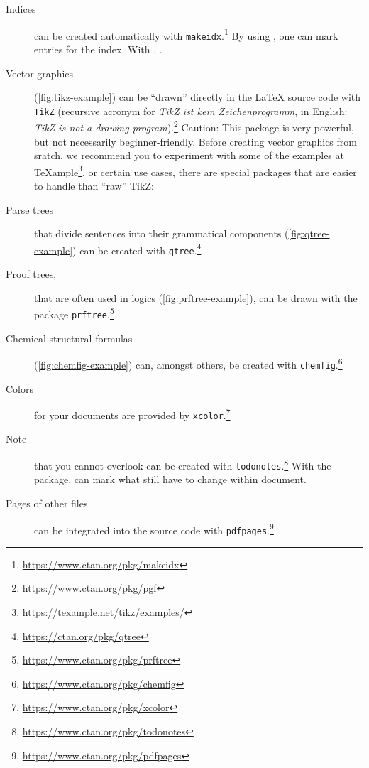 \begin{description}
	\item[Indices]
		can be created automatically with \texttt{makeidx}.\footnote{\url{https://www.ctan.org/pkg/makeidx}}
		By using \texttt{}, one can mark entries for the index. With \texttt{\printindex}, .
	\item[Vector graphics]
		(\cref{fig:tikz-example})
				can be \enquote{drawn} directly in the \LaTeX{} source code with \texttt{TikZ} (recursive acronym for \emph{TikZ ist kein Zeichenprogramm}, in English: \emph{TikZ is not a drawing program}).\footnote{\url{https://www.ctan.org/pkg/pgf}}
		Caution: This package is very powerful, but not necessarily beginner-friendly.
		Before creating vector graphics from sratch, we recommend you to experiment with some of the examples at \TeX{}ample\footnote{\url{https://texample.net/tikz/examples/}}. 
		or certain use cases, there are special packages that are easier to handle than \enquote{raw} TikZ:
	\item[Parse trees]
		that divide sentences into their grammatical components (\cref{fig:qtree-example}) can be created with \texttt{qtree}.\footnote{\url{https://ctan.org/pkg/qtree}}
	\item[Proof trees,]
		that are often used in logics (\cref{fig:prftree-example}), can be drawn with the package \texttt{prftree}.\footnote{\url{https://www.ctan.org/pkg/prftree}}
	\item[Chemical structural formulas]
		(\cref{fig:chemfig-example})
		can, amongst others, be created with  \texttt{chemfig}.\footnote{\url{https://www.ctan.org/pkg/chemfig}}
	\item[Colors]
		for your documents are provided by \texttt{xcolor}.\footnote{\url{https://www.ctan.org/pkg/xcolor}}
	\item[Note]
		 that you cannot overlook can be created with \texttt{todonotes}.\footnote{\url{https://www.ctan.org/pkg/todonotes}}
		With the package,  can mark what  still  have to change within  document.
	\item[Pages of other  files]
		can be integrated into the source code with \texttt{pdfpages}.\footnote{\url{https://www.ctan.org/pkg/pdfpages}}

\end{description}
